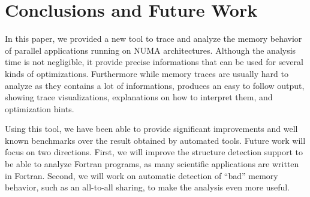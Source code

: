 
\section{Conclusions and Future Work}
\label{sec:concl}


In this paper, we provided a new tool to trace and analyze the memory
behavior of parallel applications running on NUMA architectures. Although the analysis time is not negligible, it provide precise informations that can be used for several kinds of
optimizations. Furthermore while memory traces are usually hard to analyze as
they contains a lot of informations, \TABARNAC produces an easy to follow
output, showing trace visualizations, explanations on how to interpret
them, and optimization hints.

Using this tool, we have been able to provide significant improvements and
well known benchmarks over the result obtained by automated tools.
Future work will focus on two directions. First, we will improve the
structure detection support to be able to analyze Fortran programs, as many
scientific applications are written in Fortran. Second, we will work
on automatic detection of ``bad'' memory behavior, such as an all-to-all sharing,
to make the analysis even more useful.

